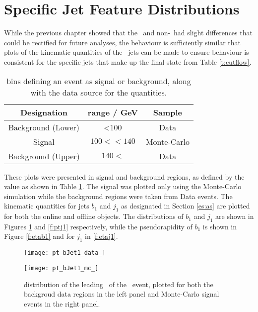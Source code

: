 \section{Specific Jet Feature Distributions}
\label{k:jets}

	While the previous chapter showed that the \bjets\ and non-\bjets\ had slight differences that could be rectified for future analyses, the behaviour is sufficiently similar that plots of the kinematic quantities of the \VBFHBB\ jets can be made to ensure behaviour is consistent for the specific jets that make up the final state from Table \ref{t:cutflow}.

	\begin{table}[h]
		\caption[Signal/Background definition \mbb values]{\mbb bins defining an event as signal or background, along with the data source for the quantities.}
		\label{t:signalback}
		\medskip
		\centering
		\begin{tabular}{ccc}\toprule
			Designation & \mbb range / GeV & Sample \\\midrule
			Background (Lower) & \mbb<$100$ & Data \\
			Signal & $100<$\mbb$<140$ & Monte-Carlo \\
			Background (Upper) &  $140<$\mbb & Data \\
			\bottomrule
		\end{tabular}
	\end{table}

	These plots were presented in signal and background regions, as defined by the \mbb value as shown in Table \ref{t:signalback}. The signal was plotted only using the Monte-Carlo simulation while the background regions were taken from Data events. The kinematic quantities for jets $b_1$ and $j_1$ as designated in Section \ref{es:as} are plotted for both the online and offline objects. The \pt distributions of $b_1$ and $j_1$ are shown in Figures \ref{f:ptb1} and \ref{f:ptj1} respectively, while the pseudorapidity of $b_1$ is shown in Figure \ref{f:etab1} and for $j_1$ in \ref{f:etaj1}.

		\begin{figure}[h]
			\centering

			\begin{minipage}[h]{0.48\linewidth}
				\texttt{[image: pt\_bJet1\_data\_]}
			\end{minipage}
			\quad
			\begin{minipage}[h]{0.48\linewidth}
				\texttt{[image: pt\_bJet1\_mc\_]}
			\end{minipage}
			\label{f:ptb1}
			\caption[\pt distribution of the leading \bjet\ of the \VBFHBB\ event]{\pt distribution of the leading \bjet\ of the \VBFHBB\ event, plotted for both the backgroud data regions in the left panel and Monte-Carlo signal events in the right panel.}
		\end{figure}

